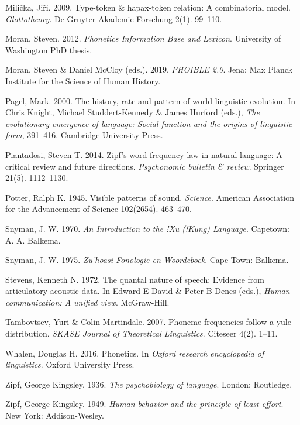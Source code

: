 \documentclass[
]{article}
\newlength{\cslhangindent}
\newlength{\cslentryspacingunit} %
\newenvironment{CSLReferences}[2] %
 {%
  \setlength{\parindent}{0pt}
  \ifodd #1
  \let\oldpar\par
  \def\par{\hangindent=\cslhangindent\oldpar}
  \fi
  \setlength{\parskip}{#2\cslentryspacingunit}
 }%
 {}
\begin{document}
\begin{CSLReferences}{1}{0}
\leavevmode{}%
Milička, Jiři. 2009. Type-token \& hapax-token relation: A combinatorial
model. \emph{Glottotheory}. De Gruyter Akademie Forschung 2(1). 99--110.

\leavevmode{}%
Moran, Steven. 2012. \emph{{Phonetics Information Base and Lexicon}}.
University of Washington PhD thesis.

\leavevmode{}%
Moran, Steven \& Daniel McCloy (eds.). 2019. \emph{{PHOIBLE 2.0}}. Jena:
Max Planck Institute for the Science of Human History.

\leavevmode{}%
Pagel, Mark. 2000. The history, rate and pattern of world linguistic
evolution. In Chris Knight, Michael Studdert-Kennedy \& James Hurford
(eds.), \emph{The evolutionary emergence of language: Social function
and the origins of linguistic form}, 391--416. Cambridge University
Press.

\leavevmode{}%
Piantadosi, Steven T. 2014. Zipf's word frequency law in natural
language: A critical review and future directions. \emph{Psychonomic
bulletin \& review}. Springer 21(5). 1112--1130.

\leavevmode{}%
Potter, Ralph K. 1945. Visible patterns of sound. \emph{Science}.
American Association for the Advancement of Science 102(2654). 463--470.

\leavevmode{}%
Snyman, J. W. 1970. \emph{{An Introduction to the !Xu (!Kung)
Language}}. Capetown: A. A. Balkema.

\leavevmode{}%
Snyman, J. W. 1975. \emph{{Zu\textbar'hoasi Fonologie en Woordeboek}}.
Cape Town: Balkema.

\leavevmode{}%
Stevens, Kenneth N. 1972. The quantal nature of speech: Evidence from
articulatory-acoustic data. In Edward E David \& Peter B Denes (eds.),
\emph{Human communication: A unified view}. McGraw-Hill.

\leavevmode{}%
Tambovtsev, Yuri \& Colin Martindale. 2007. Phoneme frequencies follow a
yule distribution. \emph{SKASE Journal of Theoretical Linguistics}.
Citeseer 4(2). 1--11.

\leavevmode{}%
Whalen, Douglas H. 2016. Phonetics. In \emph{Oxford research
encyclopedia of linguistics}. Oxford University Press.

\leavevmode{}%
Zipf, George Kingsley. 1936. \emph{The psychobiology of language}.
London: Routledge.

\leavevmode{}%
Zipf, George Kingsley. 1949. \emph{Human behavior and the principle of
least effort}. New York: Addison-Wesley.

\end{CSLReferences}
\end{document}
